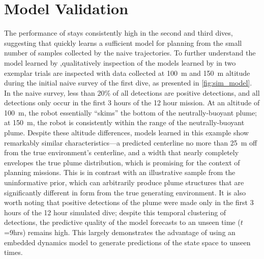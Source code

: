 \section{\PHUMES Model Validation}
\label{sec:phumes_perform}
The performance of \PHORTEX stays consistently high in the second and third dives, suggesting that \PHUMES quickly learns a sufficient model for planning from the small number of samples collected by the naive trajectories. To further understand the model learned by \PHUMES,qualitatively inspection of the models learned by \PHUMES in two exemplar trials are inspected with data collected at \SI{100}{\meter} and \SI{150}{\meter} altitude during the initial naive survey of the first dive, as presented in \cref{fig:sim_model}. In the naive survey, less than 20\% of all detections are positive detections, and all detections only occur in the first 3 hours of the 12 hour mission. At an altitude of \SI{100}{\meter}, the robot essentially ``skims'' the bottom of the neutrally-buoyant plume; at \SI{150}{\meter}, the robot is consistently within the range of the neutrally-buoyant plume. Despite these altitude differences, models learned in this example show remarkably similar characteristics---a predicted centerline no more than \SI{25}{\meter} off from the true environment's centerline, and a width that nearly completely envelopes the true plume distribution, which is promising for the context of planning missions. This is in contrast with an illustrative sample from the uninformative prior, which can arbitrarily produce plume structures that are significantly different in form from the true generating environment. It is also worth noting that positive detections of the plume were made only in the first 3 hours of the 12 hour simulated dive; despite this temporal clustering of detections, the predictive quality of the model forecasts to an unseen time ($t$=9hrs) remains high. This largely demonstrates the advantage of using an embedded dynamics model to generate predictions of the state space to unseen times.


